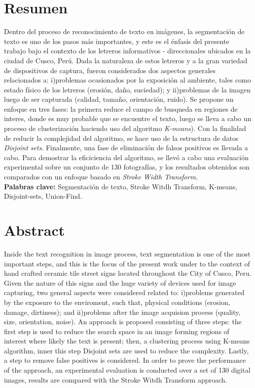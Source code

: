 \documentclass[12pt,oneside,a4paper]{book}
\theoremstyle{definition}
\begin{document}
\chapter*{Resumen}

Dentro del proceso de reconocimiento de texto en imágenes, la segmentación de 
texto es uno de los pasos más importantes, y este es el énfasis del presente
trabajo bajo el contexto de los letreros informativos - direccionales ubicados 
en la ciudad de Cusco, Perú. Dada la naturaleza de estos letreros y a la gran
variedad de dispositivos de captura, fueron considerados dos aspectos generales
relacionados a: i)problemas ocasionados por la exposición al ambiente, tales como 
estado físico de los letreros (erosión, daño, suciedad); y ii)problemas de la 
imagen luego de ser capturada (calidad, tamaño, orientación, ruido). Se propone 
un enfoque en tres fases: la primera reduce el campo de busqueda en regiones de interes, 
donde es muy probable que se encuentre el texto, luego se lleva a cabo un proceso
de clusterización haciendo uso del algoritmo \textit{K-means}). Con la finalidad
de reducir la complejidad del algoritmo, se hace uso de la estructura de datos 
\textit{Disjoint sets}. Finalmente, una fase de eliminación de falsos positivos 
es llevada a cabo. Para demostrar la eficiciencia del algoritmo, se llevó a cabo
una evaluación experimental sobre un conjunto de 130 fotografías, y los 
resultados obtenidos son comparados con un enfoque basado en 
\textit{Stroke Width Transform}.
\\

\noindent \textbf{Palabras clave:} Segmentación de texto, Stroke Witdh 
Transform, K-means, Disjoint-sets, Union-Find.

\chapter*{Abstract}

Inside the text recognition in image process, text segmentation is one of the
most important steps, and this is the focus of the present work under to the 
context of hand crafted ceramic tile street signs located throughout the City of
Cusco, Peru. Given the nature of this signs and the huge variety of devices used
for image capturing, two general aspects were considered related to: i)problems
generated by the exposure to the enviroment, such that, physical conditions (erosion,
damage, dirtiness); and ii)problems after the image acquision process (quality, 
size, orientation, noise). An approach is proposed consisting of three steps: the
first step is used to reduce the search space in an image forming regions of interest
where likely the text is present; then, a clustering process using K-means 
algorithm, inner this step Disjoint sets are used to reduce the complexity. Lastly,
a step to remove false positives is considered. In order to prove the performance
of the approach, an experimental evaluation is conducted over a set of 130 
digital images, results are compared with the Stroke Witdh Transform approach.
\\
\end{document}
